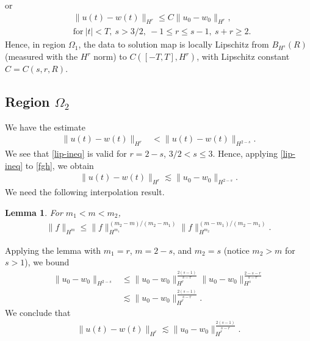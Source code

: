 \documentclass[12pt,reqno]{amsart}
\numberwithin{equation}{section}  %
\numberwithin{figure}{section}
\newtheorem{lemma}{Lemma}
\begin{document}
%
%
or
%
%
\begin{equation}
\label{lip-ineq}
\begin{split}
& \| u(t) - w(t) \|_{H^{r}} \le C \| u_{0} - w_{0} \|_{H^{r}}, 
\\
& \text{for} \ | t | < T,
\ s > 3/2, \ -1 \le r \le s-1, \ s + r \ge 2.
\end{split}
\end{equation}
%
Hence, in region $\Omega_{1}$, the data to solution map is locally Lipschitz from
$B_{H^{s}}(R)$ (measured with the $H^{r}$
norm) to $C([-T, T], H^{r})$, with Lipschitz constant $C = C(s, r, R)$.
%
%
%
%
%
%
%
%
%
%
\subsection{Region \texorpdfstring{$\Omega_{2}$}{}} 
\label{ssec:case-4}
%
We have the estimate
\begin{equation}
\label{fgh}
\begin{split}
\| u(t) - w(t) \|_{H^{r}}
& < \|u(t) - w(t) \|_{H^{2-s}}.
\end{split}
\end{equation}
%
We see that \eqref{lip-ineq} is valid for $r = 2-s$, $3/2 < s \le 3$.
Hence, applying \eqref{lip-ineq} to \eqref{fgh}, we obtain 
%
%
%
%
\begin{equation*}
\begin{split}
\| u(t) - w(t) \|_{H^{r}}
\lesssim \|u_{0} - w_{0} \|_{H^{2-s}}.
\end{split}
\end{equation*}
%
%
%
%
%
We need the following interpolation
result. 
%
%
%
%
%
%
%
%
\begin{lemma}
For $m_{1} < m < m_{2}$,
%
%
\begin{equation*}
\begin{split}
\| f \|_{H^{m}} \le \| f \|_{H^{m_{1}}}^{(m_{2}-m)/(m_{2} - m_{1})} \| f
\|_{H^{m_{2}}}^{(m -m_{1})/(m_{2} - m_{1})}.
\end{split}
\end{equation*}
%
%
%
%
%
%
\label{lem:interp}
\end{lemma}
%
Applying the lemma with $m_{1} =r$, $m = 2-s$, and $m_{2} = s$ (notice
$m_{2} > m$ for $s > 1$), we bound 
%
%
\begin{equation*}
\begin{split}
\| u_{0} - w_{0} \|_{H^{2-s}} 
& \le \| u_{0} - w_{0} \|_{H^{r}}^{\frac{2(s-1)}{s-r}} \| u_{0} - w_{0}
\|_{H^{s}}^{\frac{2-s-r}{s-r}}
\\
&  \lesssim \| u_{0} - w_{0} \|_{H^{r}}^{\frac{2(s-1)}{s-r}}.
\end{split}
\end{equation*}
%
We conclude that
%
%
\begin{equation*}
\begin{split}
\| u(t) - w(t) \|_{H^{r}} \lesssim \|u_{0} - w_{0} \|_{H^{r}}^{\frac{2(s-1)}{s-r}}.
\end{split}
\end{equation*}
%
%
%
%
\end{document}
